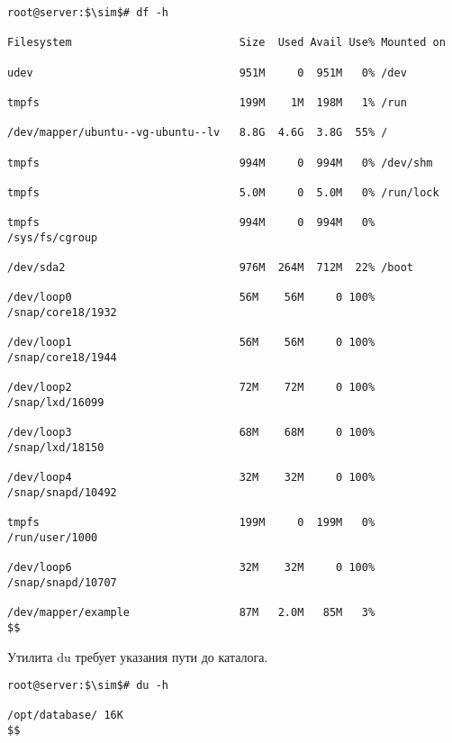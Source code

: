 \documentclass[14pt, a4paper]{article}
\begin{document}
\begin{lstlisting}
root@server:$\sim$# df -h

Filesystem                          Size  Used Avail Use% Mounted on

udev                                951M     0  951M   0% /dev

tmpfs                               199M    1M  198M   1% /run

/dev/mapper/ubuntu--vg-ubuntu--lv   8.8G  4.6G  3.8G  55% /
                                            
tmpfs                               994M     0  994M   0% /dev/shm

tmpfs                               5.0M     0  5.0M   0% /run/lock
                                            
tmpfs                               994M     0  994M   0% /sys/fs/cgroup
                                            
/dev/sda2                           976M  264M  712M  22% /boot
                                            
/dev/loop0                          56M    56M     0 100% /snap/core18/1932
                                            
/dev/loop1                          56M    56M     0 100% /snap/core18/1944
                                           
/dev/loop2                          72M    72M     0 100% /snap/lxd/16099
                                            
/dev/loop3                          68M    68M     0 100% /snap/lxd/18150

/dev/loop4                          32M    32M     0 100% /snap/snapd/10492

tmpfs                               199M     0  199M   0% /run/user/1000

/dev/loop6                          32M    32M     0 100% /snap/snapd/10707

/dev/mapper/example                 87M   2.0M   85M   3%
$$
\end{lstlisting}
\vspace{0.2cm}

Утилита du требует указания пути до каталога.
\vspace{0.3cm}

\begin{lstlisting}
root@server:$\sim$# du -h

/opt/database/ 16K
$$
\end{lstlisting}
\end{document}
